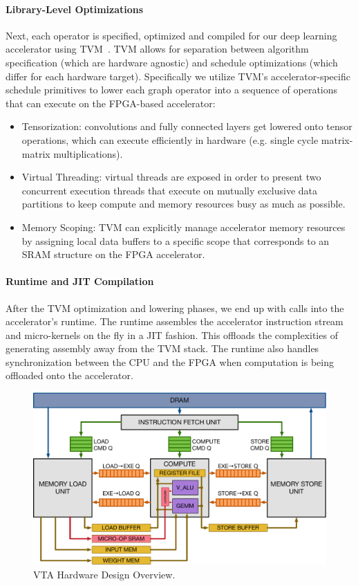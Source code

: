 \documentclass[sigconf]{acmart}
\begin{document}
\paragraph{Library-Level Optimizations}
Next, each operator is specified, optimized and compiled for our deep learning accelerator using TVM~\cite{chen:TVM}.
TVM allows for separation between algorithm specification (which are hardware agnostic) and schedule optimizations (which differ for each hardware target).
Specifically we utilize TVM's accelerator-specific schedule primitives to lower each graph operator into a sequence of operations that can execute on the FPGA-based accelerator:
\begin{itemize}
  \item Tensorization: convolutions and fully connected layers get lowered onto tensor operations, which can execute efficiently in hardware (e.g. single cycle matrix-matrix multiplications).
  \item Virtual Threading: virtual threads are exposed in order to present two concurrent execution threads that execute on mutually exclusive data partitions to keep compute and memory resources busy as much as possible.
  \item Memory Scoping: TVM can explicitly manage accelerator memory resources by assigning local data buffers to a specific scope that corresponds to an SRAM structure on the FPGA accelerator.
\end{itemize}

\paragraph{Runtime and JIT Compilation}
After the TVM optimization and lowering phases, we end up with calls into the accelerator's runtime.
The runtime assembles the accelerator instruction stream and micro-kernels on the fly in a JIT fashion.
This offloads the complexities of generating assembly away from the TVM stack.
The runtime also handles synchronization between the CPU and the FPGA when computation is being offloaded onto the accelerator.

\begin{figure}[t]
\centering
\includegraphics[width=0.8\columnwidth]{figures/vta_overview}
\caption{VTA Hardware Design Overview.}
\label{fig:vta_overview}
\end{figure}
\end{document}
